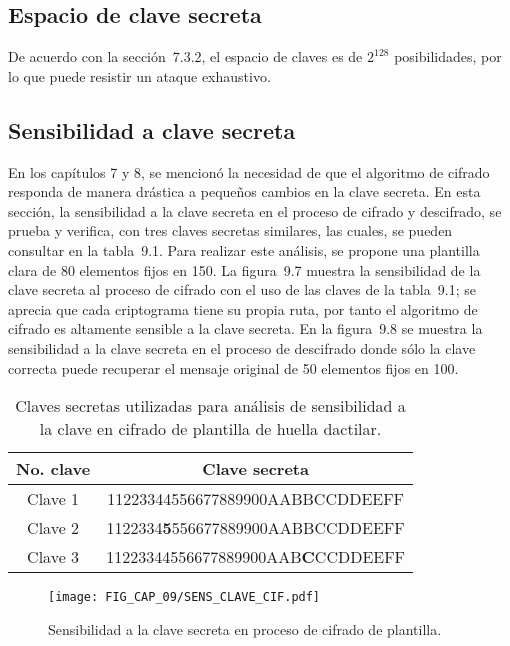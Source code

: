 \subsection{Espacio de clave secreta}
De acuerdo con la sección~7.3.2, el espacio de claves es de $2^{128}$ posibilidades, por lo que puede resistir un ataque exhaustivo.

\subsection{Sensibilidad a clave secreta}
En los capítulos 7 y 8, se mencionó la necesidad de que el algoritmo de cifrado responda de manera drástica a pequeños cambios en la clave secreta. En esta sección, la sensibilidad a la clave secreta en el proceso de cifrado y descifrado, se prueba y verifica, con tres claves secretas similares, las cuales, se pueden consultar en la tabla~9.1. Para realizar este análisis, se propone una plantilla clara de 80 elementos fijos en 150. La figura~9.7 muestra la sensibilidad de la clave secreta al proceso de cifrado con el uso de las claves de la tabla~9.1; se aprecia que cada criptograma tiene su propia ruta, por tanto el algoritmo de cifrado es altamente sensible a la clave secreta. En la figura~9.8 se muestra la sensibilidad a la clave secreta en el proceso de descifrado donde sólo la clave correcta puede recuperar el mensaje original de 50 elementos fijos en 100. \\

\begin{table}[!htbp] %
	\center
	\begin{tabular}{c c} 
	\hline
	No. clave & Clave secreta \\
	\hline
	Clave 1	& 	11223344556677889900AABBCCDDEEFF	\\
	Clave 2	& 	1122334\textbf{{\large 5}}556677889900AABBCCDDEEFF	\\ 	
	Clave 3	& 	11223344556677889900AAB\textbf{{\large C}}CCDDEEFF	\\
	\hline
\end{tabular}
	\caption{Claves secretas utilizadas para análisis de sensibilidad a la clave en cifrado de plantilla de huella dactilar.}
\end{table}

\begin{figure}[!htbp] %
	\center
	\texttt{[image: FIG\_CAP\_09/SENS\_CLAVE\_CIF.pdf]}      
	\caption{Sensibilidad a la clave secreta en proceso de cifrado de plantilla.}
\end{figure}

